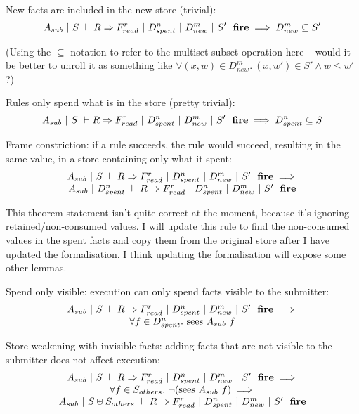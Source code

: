 \begin{lemma}
New facts are included in the new store (trivial):
$$
A_{sub}~|~S~\vdash R \Rightarrow F_{read}^r~|~D_{spent}^n~|~D_{new}^m~|~S'~~\textbf{fire}
\implies
D_{new}^m \subseteq S'
$$
\end{lemma}
(Using the $\subseteq$ notation to refer to the multiset subset operation here -- would it be better to unroll it as something like $\forall (x,w) \in D_{new}^m.\ (x,w') \in S' \wedge w \le w'$ ?)

\begin{lemma}
Rules only spend what is in the store (pretty trivial):
$$
A_{sub}~|~S~\vdash R \Rightarrow F_{read}^r~|~D_{spent}^n~|~D_{new}^m~|~S'~~\textbf{fire}
\implies
D_{spent}^n \subseteq S
$$
\end{lemma}

\begin{theorem}
Frame constriction: if a rule succeeds, the rule would succeed, resulting in the same value, in a store containing only what it spent:
$$
\begin{array}{c}
A_{sub}~|~S~\vdash R \Rightarrow F_{read}^r~|~D_{spent}^n~|~D_{new}^m~|~S'~~\textbf{fire}
\implies \\
A_{sub}~|~D_{spent}^n~\vdash R \Rightarrow F_{read}^r~|~D_{spent}^n~|~D_{new}^m~|~S'~~\textbf{fire}
\end{array}
$$
\end{theorem}
This theorem statement isn't quite correct at the moment, because it's ignoring retained/non-consumed values. I will update this rule to find the non-consumed values in the spent facts and copy them from the original store after I have updated the formalisation. I think updating the formalisation will expose some other lemmas.

\begin{theorem}
Spend only visible: execution can only spend facts visible to the submitter:
$$
\begin{array}{c}
A_{sub}~|~S~\vdash R \Rightarrow F_{read}^r~|~D_{spent}^n~|~D_{new}^m~|~S'~~\textbf{fire}
\implies \\
\forall f \in D_{spent}^n.\ \textrm{sees}~ A_{sub}~ f
\end{array}
$$
\end{theorem}

\begin{theorem}
Store weakening with invisible facts: adding facts that are not visible to the submitter does not affect execution:
$$
\begin{array}{c}
A_{sub}~|~S~\vdash R \Rightarrow F_{read}^r~|~D_{spent}^n~|~D_{new}^m~|~S'~~\textbf{fire}
\implies \\
\forall f \in S_{others}.\ \neg (\textrm{sees}~ A_{sub}~ f)
\implies \\
A_{sub}~|~S \uplus S_{others}~\vdash R \Rightarrow F_{read}^r~|~D_{spent}^n~|~D_{new}^m~|~S'~~\textbf{fire}
\end{array}
$$
\end{theorem}

